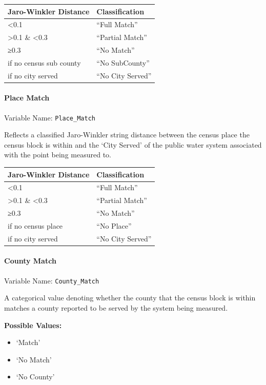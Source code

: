 \documentclass[
  letterpaper,
  DIV=11,
  numbers=noendperiod,
  oneside]{scrartcl}
\let\oldparagraph\paragraph
\renewcommand{\paragraph}[1]{\oldparagraph{#1}\mbox{}}
\providecommand{\tightlist}{%
  \setlength{\itemsep}{0pt}\setlength{\parskip}{0pt}}\usepackage{longtable,booktabs,array}
\begin{document}
\begin{longtable}[]{@{}ll@{}}
\toprule\noalign{}
Jaro-Winkler Distance & Classification \\
\midrule\noalign{}
\endhead
\bottomrule\noalign{}
\endlastfoot
\textless0.1 & ``Full Match'' \\
\textgreater0.1 \& \textless0.3 & ``Partial Match'' \\
≥0.3 & ``No Match'' \\
if no census sub county & ``No SubCounty'' \\
if no city served & ``No City Served'' \\
\end{longtable}

\paragraph{Place Match}\label{place-match}

Variable Name: \texttt{Place\_Match}

Reflects a classified Jaro-Winkler string distance between the census
place the census block is within and the `City Served' of the public
water system associated with the point being measured to.

\begin{longtable}[]{@{}ll@{}}
\toprule\noalign{}
Jaro-Winkler Distance & Classification \\
\midrule\noalign{}
\endhead
\bottomrule\noalign{}
\endlastfoot
\textless0.1 & ``Full Match'' \\
\textgreater0.1 \& \textless0.3 & ``Partial Match'' \\
≥0.3 & ``No Match'' \\
if no census place & ``No Place'' \\
if no city served & ``No City Served'' \\
\end{longtable}

\paragraph{County Match}\label{county-match}

Variable Name: \texttt{County\_Match}

A categorical value denoting whether the county that the census block is
within matches a county reported to be served by the system being
measured.

\textbf{Possible Values:}

\begin{itemize}
\tightlist
\item
  `Match'
\item
  `No Match'
\item
  `No County'
\end{itemize}
\end{document}
